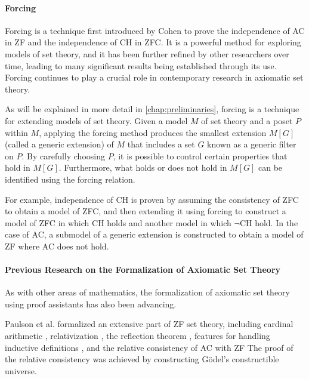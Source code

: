 \documentclass{report}
\begin{document}
\paragraph{Forcing}

Forcing is a technique first introduced by Cohen \cite{cohen} to prove the independence of AC in ZF 
and the independence of CH in ZFC. 
It is a powerful method for exploring models of set theory, 
and it has been further refined by other researchers over time, 
leading to many significant results being established through its use. 
Forcing continues to play a crucial role in contemporary research in axiomatic set theory.

As will be explained in more detail in \cref{chap:preliminaries}, 
forcing is a technique for extending models of set theory.
Given a model $M$ of set theory and a poset $P$ within $M$,
applying the forcing method produces the smallest extension $M[G]$ (called a generic extension) of $M$ 
that includes a set $G$ known as a generic filter on $P$.
By carefully choosing $P$, it is possible to control certain properties that hold in $M[G]$.
Furthermore, what holds or does not hold in $M[G]$ can be identified using the forcing relation.

For example, independence of CH is proven by assuming the consistency of ZFC to obtain a model of ZFC, 
and then extending it using forcing to construct a model of ZFC in which CH holds 
and another model in which $\neg$CH hold.
In the case of AC, a submodel of a generic extension is constructed to obtain a model of ZF where AC does not hold.

\paragraph{Previous Research on the Formalization of Axiomatic Set Theory}

As with other areas of mathematics, the formalization of axiomatic set theory using proof assistants has also been advancing.

Paulson et al. formalized an extensive part of ZF set theory,
including cardinal arithmetic \cite{paulson_cardinal_AC}, relativization \cite{paulson_AC_consistency}, the reflection theorem \cite{paulson_reflection}, 
features for handling inductive definitions \cite{paulson_datatype_impl}, and the relative consistency of AC with ZF \cite{paulson_AC_consistency}
The proof of the relative consistency was achieved by constructing Gödel's constructible universe.
\end{document}
